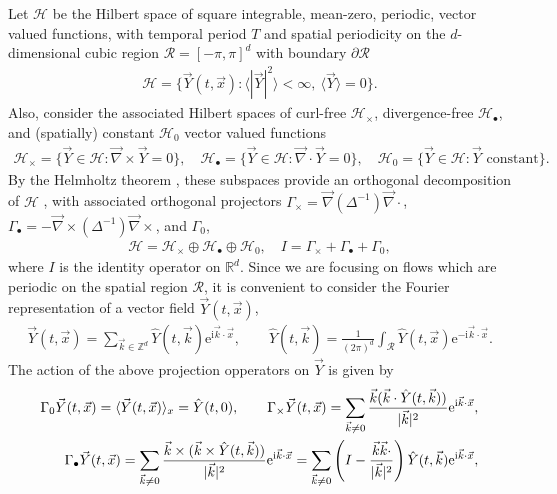 \documentclass[11pt]{amsart}
\newcommand{\I}{\mathrm{i}}
\newcommand{\e}{\mathrm{e}}
\begin{document}
Let $\mathscr{H}$ be the Hilbert space of square integrable,
mean-zero, periodic, vector valued functions, with temporal 
period $T$ and spatial periodicity on the $d$-dimensional cubic
region $\mathcal{R}=[-\pi,\pi]^d$ with boundary $\partial\mathcal{R}$   
%
\begin{align}
  \mathscr{H}=\{\vec{Y}(t,\vec{x}):\langle|\vec{Y}|^2\rangle<\infty, \ \langle\vec{Y}\rangle=0
  \}.  
\end{align}
%
Also, consider the associated Hilbert spaces of curl-free
$\mathscr{H}_\times$, divergence-free $\mathscr{H}_\bullet$, and (spatially)
constant $\mathscr{H}_0$ vector valued functions  
%
\begin{align}
  \mathscr{H}_\times=\{\vec{Y}\in\mathscr{H}:\vec{\nabla}\times\vec{Y}=0\}, \quad
  \mathscr{H}_\bullet=\{\vec{Y}\in\mathscr{H}:\vec{\nabla}\cdot\vec{Y}=0\}, \quad
  \mathscr{H}_0=\{\vec{Y}\in\mathscr{H}:\vec{Y} \text{ constant}\}.
\end{align}
%
By the Helmholtz theorem
\cite{Golden:CMP-473,Denaro:2003:0271,Bhatia:IEE:1077}, these 
subspaces provide an orthogonal decomposition of 
$\mathscr{H}$ \cite{Fannjiang:SIAM_JAM:333}, with
associated orthogonal projectors $\Gamma_\times=\vec{\nabla}(\Delta^{-1})\vec{\nabla}\cdot$,
$\Gamma_\bullet=-\vec{\nabla}\times(\Delta^{-1})\vec{\nabla}\times$, and $\Gamma_0$,
\cite{Fannjiang:SIAM_JAM:333,Murphy:CMS:Submitted} 
%
\begin{align}
  \mathscr{H}=\mathscr{H}_\times\oplus\mathscr{H}_\bullet\oplus\mathscr{H}_0,\quad
  I=\Gamma_\times+\Gamma_\bullet+\Gamma_0,
\end{align}
%
where $I$ is the identity operator on $\mathbb{R}^d$.
Since we are focusing on flows which are periodic on the spatial
region $\mathcal{R}$, it is convenient to consider the Fourier
representation of a vector field $\vec{Y}(t,\vec{x})$, 
%
\begin{align}
  \vec{Y}(t,\vec{x})
    =\sum_{\vec{k}\in\mathbb{Z}^d}
       \hat{Y}(t,\vec{k})\e^{\I\vec{k}\cdot\vec{x}},
  \qquad
  \hat{Y}(t,\vec{k})
    =\frac{1}{(2\pi)^d}\int_{\mathcal{R}}
       \hat{Y}(t,\vec{x})\e^{-\I\vec{k}\cdot\vec{x}}.
\end{align}
%
The action of the above projection opperators on
$\vec{Y}$ is given by \cite{Fannjiang:SIAM_JAM:333} 
%
\begin{align}\label{eq:Projections}
  \Gamma_0\vec{Y}(t,\vec{x})
    =\langle\vec{Y}(t,\vec{x})\rangle_x
    =\hat{Y}(t,0),
    \qquad
  \Gamma_\times\vec{Y}(t,\vec{x})
    =\sum_{\vec{k}\neq0}
       \frac{\vec{k}(\vec{k}\cdot\hat{Y}(t,\vec{k}))}{|\vec{k}|^2}
       \e^{\I\vec{k}\cdot\vec{x}},
    \\
  \Gamma_\bullet\vec{Y}(t,\vec{x})
    =\sum_{\vec{k}\neq0}
       \frac{\vec{k}\times(\vec{k}\times\hat{Y}(t,\vec{k}))}{|\vec{k}|^2}
       \e^{\I\vec{k}\cdot\vec{x}}
    =\sum_{\vec{k}\neq0}\left(I-
       \frac{\vec{k}\vec{k}\cdot}{|\vec{k}|^2}\right) 
       \hat{Y}(t,\vec{k})\e^{\I\vec{k}\cdot\vec{x}},
       \notag
\end{align}
\end{document}

